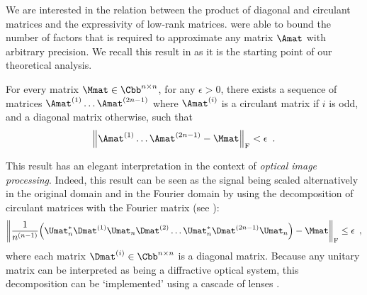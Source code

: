We are interested in the relation between the product of diagonal and circulant matrices and the expressivity of low-rank matrices.
\citet{huhtanen2015factoring} were able to bound the number of factors that is required to approximate any matrix $\Amat$ with arbitrary precision.
We recall this result in  as it is the starting point of our theoretical analysis.

\begin{theorem} \label{theorem:ch4-huhtanen}
  For every matrix $\Mmat \in \Cnn$, for any $\epsilon > 0$, there exists a sequence of matrices $\Amat^{(1)} \ldots \Amat^{(2n-1)}$ where $\Amat^{(i)}$ is a circulant matrix if $i$ is odd, and a diagonal matrix otherwise, such that
  \begin{equation}
    \norm{\Amat^{(1)} \ldots \Amat^{(2n-1)} - \Mmat}_\fro < \epsilon \enspace.
  \end{equation}
  \removespace
\end{theorem}

This result has an elegant interpretation in the context of \emph{optical image processing}.
Indeed, this result can be seen as the signal being scaled alternatively in the original domain and in the Fourier domain by using the decomposition of circulant matrices with the Fourier matrix (see ):
\begin{equation}
  \norm{ \frac{1}{n^{(n-1)}} \left( \Umat_n^* \Dmat^{(1)} \Umat_n \Dmat^{(2)} \dots \Umat_n^* \Dmat^{(2n-1)} \Umat_n \right) - \Mmat}_\fro \leq \epsilon \enspace,
\end{equation}
where each matrix $\Dmat^{(i)} \in \Cbb^{n \times n}$ is a diagonal matrix.
Because any unitary matrix can be interpreted as being a diffractive optical system, this decomposition can be `implemented' using a cascade of lenses \cite{muller1998algorithmic}.






